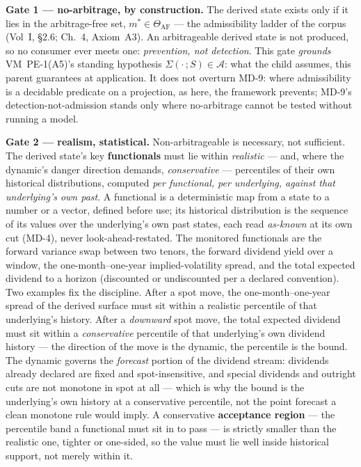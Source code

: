 \documentclass[11pt,a4paper]{article}
\begin{document}
\textbf{Gate 1 --- no-arbitrage, by construction.} The derived state exists only
if it lies in the arbitrage-free set, $m^\ast \in \Theta_{\mathrm{AF}}$ --- the
admissibility ladder of the corpus (Vol~I, \S2.6; Ch.~4, Axiom~A3). An
arbitrageable derived state is not produced, so no consumer ever meets one:
\emph{prevention, not detection}. This gate \emph{grounds} VM~PE-1(A5)'s standing
hypothesis $\Sigma(\cdot\,;S)\in\mathcal{A}$: what the child assumes, this parent
guarantees at application. It does not overturn MD-9: where admissibility is a
decidable predicate on a projection, as here, the framework prevents; MD-9's
detection-not-admission stands only where no-arbitrage cannot be tested without
running a model.

\textbf{Gate 2 --- realism, statistical.} Non-arbitrageable is necessary, not
sufficient. The derived state's key \textbf{functionals} must lie within
\emph{realistic} --- and, where the dynamic's danger direction demands,
\emph{conservative} --- percentiles of their own historical distributions,
computed \emph{per functional, per underlying, against that underlying's own
past}. A functional is a deterministic map from a state to a number or a vector,
defined before use; its historical distribution is the sequence of its values
over the underlying's own past states, each read \emph{as-known} at its own cut
(MD-4), never look-ahead-restated. The monitored functionals are the forward
variance swap between two tenors, the forward dividend yield over a window, the
one-month--one-year implied-volatility spread, and the total expected dividend to
a horizon (discounted or undiscounted per a declared convention). Two examples fix the discipline. After a spot move, the
one-month--one-year spread of the derived surface must sit within a realistic
percentile of that underlying's history. After a \emph{downward} spot move, the
total expected dividend must sit within a \emph{conservative} percentile of that
underlying's own dividend history --- the direction of the move is the dynamic,
the percentile is the bound. The dynamic governs the \emph{forecast} portion of
the dividend stream: dividends already declared are fixed and spot-insensitive,
and special dividends and outright cuts are not monotone in spot at all --- which
is why the bound is the underlying's own history at a conservative percentile,
not the point forecast a clean monotone rule would imply. A conservative
\textbf{acceptance region} --- the percentile band a functional must sit in to pass
--- is strictly smaller than the realistic one, tighter or one-sided, so the value
must lie well inside historical support, not merely within it.
\end{document}
